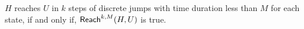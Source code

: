 %
$H$ reaches $U$ in $k$ steps of discrete jumps with time duration less than $M$ for each state, if and only if, $\mathsf{Reach}^{k,M}(H,U)$ is true.













